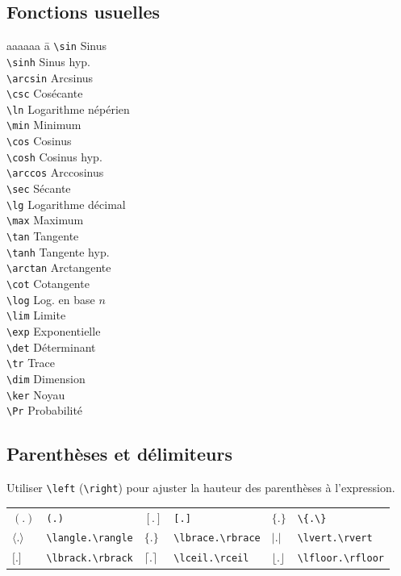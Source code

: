 \documentclass{article}
\newenvironment{tighttabbing}
  {\begingroup\setlength{\parskip}{0pt}\begin{tabbing}}
  {\end{tabbing}\endgroup}
\let\code\lstinline
\begin{document}
\begin{multicols*}{3}
\subsection*{Fonctions usuelles}
\begin{multicols*}{3}
\begin{tighttabbing}
    aaaaaa \= a \kill
    \code?\sin? \> Sinus \\
    \code?\sinh? \> Sinus hyp. \\
    \code?\arcsin? \> Arcsinus \\
    \code?\csc? \> Cosécante \\
    \code?\ln? \> Logarithme népérien \\
    \code?\min? \> Minimum \\
    \code?\cos? \> Cosinus \\
    \code?\cosh? \> Cosinus hyp. \\
    \code?\arccos? \> Arccosinus \\
    \code?\sec? \> Sécante \\
    \code?\lg? \> Logarithme décimal \\
    \code?\max? \> Maximum \\
    \code?\tan? \> Tangente \\
    \code?\tanh? \> Tangente hyp. \\
    \code?\arctan? \> Arctangente \\
    \code?\cot? \> Cotangente \\
    \code?\log? \> Log. en base $n$ \\
    \code?\lim? \> Limite \\
    \code?\exp? \> Exponentielle \\
    \code?\det?  \> Déterminant \\
    \code?\tr?  \> Trace \\
    \code?\dim? \> Dimension \\
    \code?\ker? \> Noyau \\
    \code?\Pr?  \> Probabilité
\end{tighttabbing}
\end{multicols*}

\subsection*{Parenthèses et délimiteurs}
Utiliser \code+\left+ (\code+\right+) pour ajuster la hauteur des parenthèses à l'expression.
\begin{tabular}{p{0.5cm}p{2cm}p{0.5cm}p{2cm}p{0.5cm}p{2cm}}
    $(.)$             & \code+(.)+             & $[.]$             & \code+[.]+             & $\{.\}$           & \code+\{.\}+           \\
    $\langle.\rangle$ & \code+\langle.\rangle+ & $\lbrace.\rbrace$ & \code!\lbrace.\rbrace! & $\lvert.\rvert$   & \code!\lvert.\rvert!   \\
    $\lbrack.\rbrack$ & \code!\lbrack.\rbrack! & $\lceil.\rceil$   & \code!\lceil.\rceil!   & $\lfloor.\rfloor$ & \code!\lfloor.\rfloor! \\
\end{tabular}

\end{multicols*}
\end{document}
